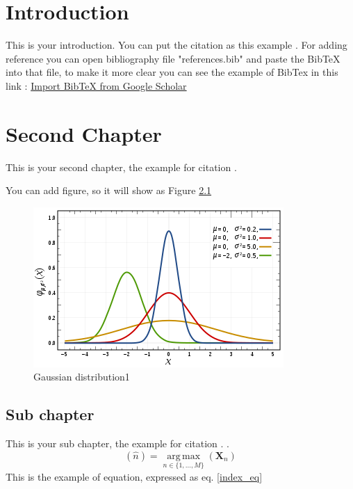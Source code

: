\documentclass[12pt, twoside , openright]{book}
\begin{document}
\listoftables
\newpage




\mainmatter

\chapter{Introduction}
This is your introduction. You can put the citation as this example \cite{CpLi}. For adding reference you can open bibliography file "references.bib" and paste the BibTeX into that file, to make it more clear you can see the example of BibTex in this link : \href{https://www.youtube.com/watch?v=SsJSR2b4_qc&t=107s}{Import BibTeX from Google Scholar}

 \blindtext[2] %





\chapter{Second Chapter}
This is your second chapter, the example for citation \cite{Ymc}. \blindtext[1]

You can add figure, so it will show as Figure \ref{fig:figure_ref}
\begin{figure}[h]
	\centerline{\includegraphics[width=0.5\columnwidth]{Images/gambar.png}}
	\caption{Gaussian distribution1}
	\label{fig:figure_ref}
\end{figure}


\section{Sub chapter}\label{sub_chapter21}
This is your sub chapter, the example for citation \cite{latexcompanion}. \blindtext[1].
\begin{equation}
\label{index_eq}
(\hat{n})=\operatorname*{arg\,max}_{n\in \{1,\dots,M\}}(\mathbf{X}_{n})
\end{equation}
This is the example of equation, expressed as eq. \ref{index_eq}
\end{document}
